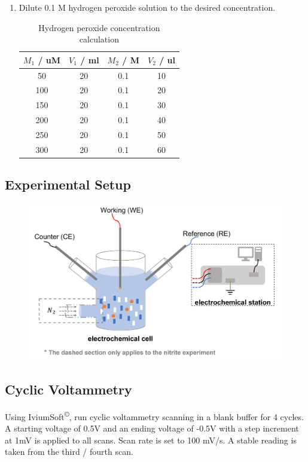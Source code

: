 \begin{appendices}
\begin{enumerate}
    \item Dilute 0.1 M hydrogen peroxide solution to the desired concentration.
    \begin{table}[H]
        \centering
        \begin{tabular}{|c|c|c|c|} \hline
            $M_{1}$ / uM & $V_{1}$ / ml & $M_{2}$ / M & $V_{2}$ / ul \\ \hline
            50  & 20 & 0.1 & 10 \\ \hline
            100 & 20 & 0.1 & 20 \\ \hline
            150 & 20 & 0.1 & 30 \\ \hline
            200 & 20 & 0.1 & 40 \\ \hline
            250 & 20 & 0.1 & 50 \\ \hline
            300 & 20 & 0.1 & 60 \\ \hline
        \end{tabular}
        \caption{Hydrogen peroxide concentration calculation}
        \label{tab:my_label}
    \end{table}
\end{enumerate}

\subsection{Experimental Setup}
\begin{figure}[H]
    \centering
    \includegraphics[width=.6\textwidth]{img/h2o2_setup.png}
\end{figure}

\subsection{Cyclic Voltammetry}
Using IviumSoft\textsuperscript{\copyright}, run cyclic voltammetry  scanning in a blank buffer for 4 cycles. A starting voltage of 0.5V and an ending voltage of -0.5V  with a step increment at 1mV is applied to all scans. Scan rate is set to 100 mV/s. A stable reading is taken from the third / fourth scan. 


\end{appendices}
